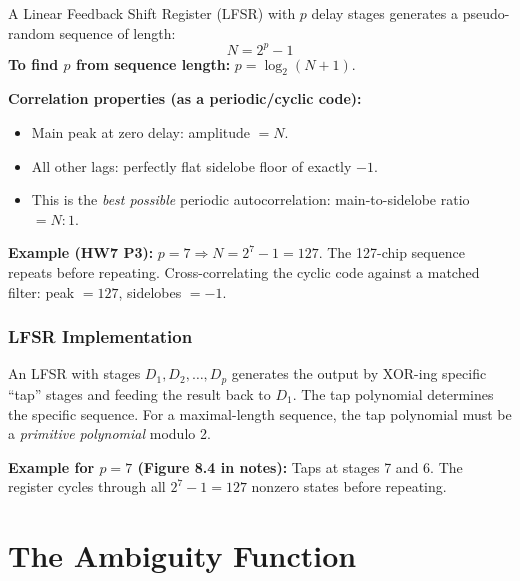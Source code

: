 \documentclass[10pt,letterpaper]{article}
\begin{document}
\begin{tcolorbox}[formulabox, title={LFSR / PRN Sequences}]
A Linear Feedback Shift Register (LFSR) with $p$ delay stages generates a pseudo-random sequence of length:
\begin{equation}
  N = 2^p - 1
\end{equation}
\textbf{To find $p$ from sequence length:} $p = \log_2(N+1)$.

\textbf{Correlation properties (as a periodic/cyclic code):}
\begin{itemize}[noitemsep]
  \item Main peak at zero delay: amplitude $= N$.
  \item All other lags: perfectly flat sidelobe floor of exactly $-1$.
  \item This is the \emph{best possible} periodic autocorrelation: main-to-sidelobe ratio $= N:1$.
\end{itemize}

\textbf{Example (HW7 P3):} $p = 7 \Rightarrow N = 2^7 - 1 = 127$. The 127-chip sequence repeats before repeating. Cross-correlating the cyclic code against a matched filter: peak $= 127$, sidelobes $= -1$.
\end{tcolorbox}

\subsubsection{LFSR Implementation}
An LFSR with stages $D_1, D_2, \ldots, D_p$ generates the output by XOR-ing specific ``tap'' stages and feeding the result back to $D_1$. The tap polynomial determines the specific sequence. For a maximal-length sequence, the tap polynomial must be a \emph{primitive polynomial} modulo 2.

\textbf{Example for $p=7$ (Figure 8.4 in notes):} Taps at stages 7 and 6. The register cycles through all $2^7-1 = 127$ nonzero states before repeating.

\section{The Ambiguity Function}
\end{document}
